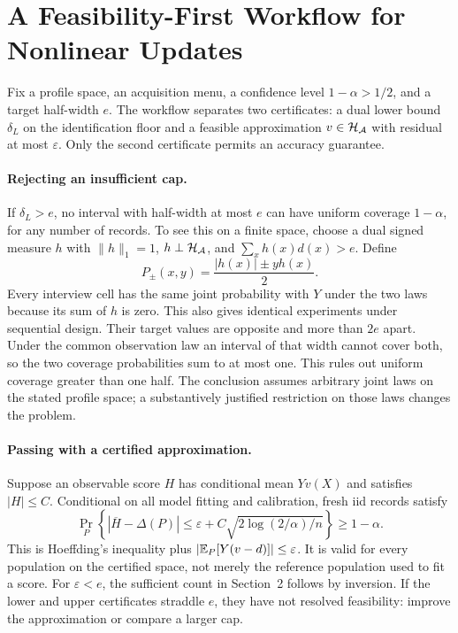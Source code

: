 \section{A Feasibility-First Workflow for Nonlinear Updates}\label{app:workflow}
Fix a profile space, an acquisition menu, a confidence level $1-\alpha>1/2$,
and a target half-width $e$. The workflow separates two certificates:
a dual lower bound $\delta_L$ on the identification floor and a feasible
approximation $v\in\mathcal H_\mathcal A$ with residual at most $\varepsilon$.
Only the second certificate permits an accuracy guarantee.

\paragraph{Rejecting an insufficient cap.}
If $\delta_L>e$, no interval with half-width at most $e$ can have uniform
coverage $1-\alpha$, for any number of records. To see this on a finite
space, choose a dual signed measure $h$ with $\|h\|_1=1$,
$h\perp\mathcal H_\mathcal A$, and $\sum_xh(x)d(x)>e$.
Define
\[
 P_\pm(x,y)=\frac{|h(x)|\pm yh(x)}2.
\]
Every interview cell has the same joint probability with $Y$ under the
two laws because its sum of $h$ is zero. This also gives identical
experiments under sequential design. Their target values are opposite
and more than $2e$ apart. Under the common observation law an interval
of that width cannot cover both, so the two coverage probabilities sum
to at most one. This rules out uniform coverage greater than one half.
The conclusion assumes arbitrary joint laws on the stated profile space;
a substantively justified restriction on those laws changes the problem.

\paragraph{Passing with a certified approximation.}
Suppose an observable score $H$ has conditional mean $Yv(X)$ and satisfies
$|H|\le C$. Conditional on all model fitting and calibration, fresh iid
records satisfy
\[
 \Pr_P\!\left\{|\overline H-\Delta(P)|
 \le\varepsilon+C\sqrt{2\log(2/\alpha)/n}\right\}\ge1-\alpha.
\]
This is Hoeffding's inequality plus
$|\mathbb{E}_P[Y(v-d)]|\le\varepsilon$. It is valid for every population on the
certified space, not merely the reference population used to fit a score.
For $\varepsilon<e$, the sufficient count in Section~2 follows by inversion.
If the lower and upper certificates straddle $e$, they have not resolved
feasibility: improve the approximation or compare a larger cap.

